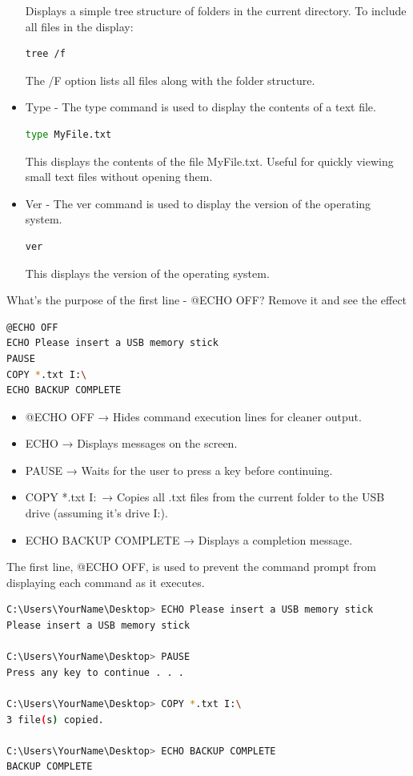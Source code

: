 \documentclass[a4paper]{article}
\begin{document}
\begin{itemize}
\begin{figure}[H]
\end{figure}
Displays a simple tree structure of folders in the current directory. To include all files in the display:
\begin{lstlisting}[language=bash]
tree /f
\end{lstlisting}
The /F option lists all files along with the folder structure.
\item Type - The type command is used to display the contents of a text file.   
\begin{lstlisting}[language=bash]
type MyFile.txt
\end{lstlisting}
This displays the contents of the file MyFile.txt. Useful for quickly viewing small text files without opening them.
\item Ver - The ver command is used to display the version of the operating system.
\begin{lstlisting}[language=bash]
ver
\end{lstlisting}
This displays the version of the operating system.


\end{itemize}
\textcolor{green!50!black}{What’s the purpose of the first line - @ECHO OFF? Remove it and see the
effect}

\begin{lstlisting}[language=bash]
@ECHO OFF
ECHO Please insert a USB memory stick
PAUSE
COPY *.txt I:\
ECHO BACKUP COMPLETE
\end{lstlisting}
\begin{itemize}
    \item @ECHO OFF → Hides command execution lines for cleaner output.
    \item ECHO → Displays messages on the screen.
    \item PAUSE → Waits for the user to press a key before continuing.
    \item COPY *.txt I:\ → Copies all .txt files from the current folder to the USB drive (assuming it's drive I:).
    \item ECHO BACKUP COMPLETE → Displays a completion message.
\end{itemize}
The first line, @ECHO OFF, is used to prevent the command prompt from displaying each command as it executes.
\begin{lstlisting}[language=bash]
C:\Users\YourName\Desktop> ECHO Please insert a USB memory stick
Please insert a USB memory stick

C:\Users\YourName\Desktop> PAUSE
Press any key to continue . . .

C:\Users\YourName\Desktop> COPY *.txt I:\
3 file(s) copied.

C:\Users\YourName\Desktop> ECHO BACKUP COMPLETE
BACKUP COMPLETE
\end{lstlisting}
\end{document}

